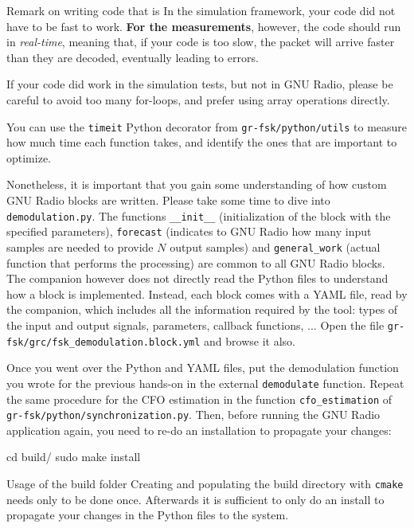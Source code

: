 \begin{bclogo}[couleur = gray!20, arrondi = 0.2, logo=\bcinfo]{Remark on writing code that is }
    In the simulation framework, your code did not have to be fast to work.
    \textbf{For the measurements}, however, the code should run in \textit{real-time},
    meaning that, if your code is too slow, the packet will arrive faster
    than they are decoded, eventually leading to errors.

    If your code did work in the simulation tests, but not in GNU Radio, please
    be careful to avoid too many for-loops, and prefer using array operations
    directly.

    You can use the \texttt{timeit} Python decorator from
    \texttt{gr-fsk/python/utils} to measure how much time each function takes,
    and identify the ones that are important to optimize.
\end{bclogo}

Nonetheless, it is important that you gain some understanding of how custom GNU Radio blocks are written.
Please take some time to dive into \texttt{demodulation.py}. The functions \texttt{\_\_init\_\_} (initialization of the block with the specified parameters),
\texttt{forecast} (indicates to GNU Radio how many input samples are needed to provide $N$ output samples) and \texttt{general\_work} (actual function that performs the processing) are common to all GNU Radio blocks.
The companion however does not directly read the Python files to understand how a block is implemented. Instead, each block comes with a
YAML file, read by the companion, which includes all the information required by the tool: types of the input and output signals, parameters,
callback functions, ... Open the file \texttt{gr-fsk/grc/fsk\_demodulation.block.yml} and browse it also.

Once you went over the Python and YAML files, put the demodulation function you wrote for the previous hands-on in the external \texttt{demodulate} function. Repeat the same procedure for the CFO estimation in the function
\texttt{cfo\_estimation} of \texttt{gr-fsk/python/synchronization.py}. Then, before running the GNU Radio application again, you need to re-do an installation to propagate your changes:
\begin{bash}
    cd build/
    sudo make install
\end{bash}
\begin{bclogo}[couleur = gray!20, arrondi = 0.2, logo=\bcinfo]{Usage of the build folder}
    Creating and populating the build directory with \texttt{cmake} needs only to be done once.
    Afterwards it is sufficient to only do an install to propagate your changes in the Python files to the system.
\end{bclogo}

